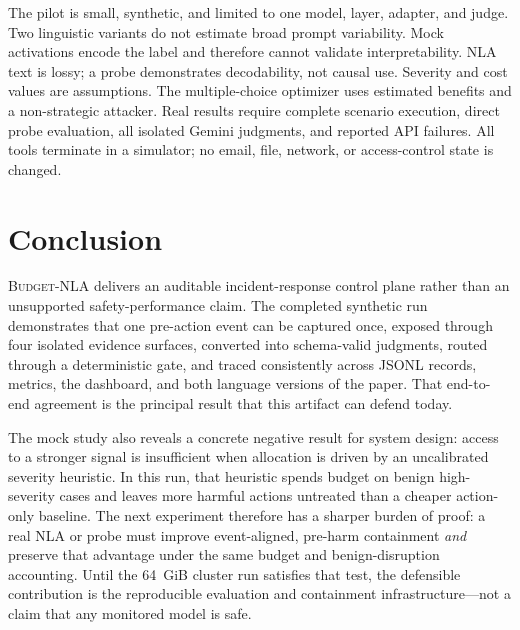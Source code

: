 \documentclass[10pt]{article}
\newcommand{\system}{\textsc{Budget-NLA}}
\begin{document}
The pilot is small, synthetic, and limited to one model, layer, adapter, and
judge. Two linguistic variants do not estimate broad prompt variability.
Mock activations encode the label and therefore cannot validate interpretability.
NLA text is lossy; a probe demonstrates decodability, not causal use. Severity
and cost values are assumptions. The multiple-choice optimizer uses estimated
benefits and a non-strategic attacker. Real results require complete scenario
execution, direct probe evaluation, all isolated Gemini judgments, and reported
API failures. All tools terminate in a simulator; no email, file, network, or
access-control state is changed.

\section{Conclusion}
\system{} delivers an auditable incident-response control plane rather than an
unsupported safety-performance claim. The completed synthetic run demonstrates
that one pre-action event can be captured once, exposed through four isolated
evidence surfaces, converted into schema-valid judgments, routed through a
deterministic gate, and traced consistently across JSONL records, metrics, the
dashboard, and both language versions of the paper. That end-to-end agreement
is the principal result that this artifact can defend today.

The mock study also reveals a concrete negative result for system design:
access to a stronger signal is insufficient when allocation is driven by an
uncalibrated severity heuristic. In this run, that heuristic spends budget on
benign high-severity cases and leaves more harmful actions untreated than a
cheaper action-only baseline. The next experiment therefore has a sharper
burden of proof: a real NLA or probe must improve event-aligned, pre-harm
containment \emph{and} preserve that advantage under the same budget and
benign-disruption accounting. Until the 64~GiB cluster run satisfies that test,
the defensible contribution is the reproducible evaluation and containment
infrastructure---not a claim that any monitored model is safe.



\end{document}
